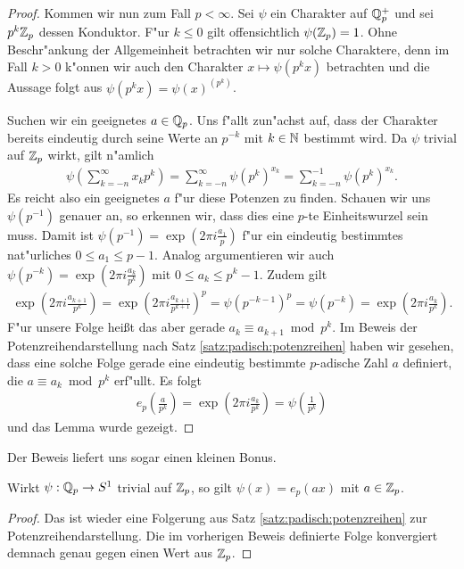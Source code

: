 \begin{proof}
			Kommen wir nun zum Fall $p<\infty$. 
			Sei $\psi$ ein Charakter auf $\mathbb{Q}_p^+$ und sei $p^k{\mathbb{Z}_p}$ dessen Konduktor.
			F"ur $k\leq0$ gilt offensichtlich $\psi({\mathbb{Z}_p})=1$.
			Ohne Beschr"ankung der Allgemeinheit betrachten wir nur solche Charaktere, denn im Fall $k>0$ k"onnen wir auch den Charakter $x\mapsto \psi(p^kx)$ betrachten und die Aussage folgt aus $\psi(p^kx) = \psi(x)^{(p^k)}$.
			
			Suchen wir ein geeignetes $a\in{\mathbb{Q}_p}$. 
			Uns f"allt zun"achst auf, dass der Charakter bereits eindeutig durch seine Werte an $p^{-k}$ mit $k \in \mathbb{N}$ bestimmt wird.
			Da $\psi$ trivial auf ${\mathbb{Z}_p}$ wirkt, gilt n"amlich
			\begin{align*}
				\psi \left( \sum_{k=-n}^\infty x_k p^k \right) = \sum_{k=-n}^{\infty} \psi \left(p^k \right)^{x_k} = \sum_{k=-n}^{-1} \psi \left(p^k \right)^{x_k}.
			\end{align*}
			Es reicht also ein geeignetes $a$ f"ur diese Potenzen zu finden.
			Schauen wir uns $\psi(p^{-1})$ genauer an, so erkennen wir, dass dies eine $p$-te Einheitswurzel sein muss.
			Damit ist $\psi(p^{-1}) = \exp(2\pi i \frac{a_1}{p})$ f"ur ein eindeutig bestimmtes nat"urliches $0\leq a_1 \leq p - 1$.
			Analog argumentieren wir auch $\psi(p^{-k}) = \exp(2\pi i \frac{a_k}{p^k})$ mit $0\leq a_k \leq p^k - 1$.
			Zudem gilt 
			\begin{align*}
				\exp\left(2\pi i \frac{a_{k+1}}{p^{k}}\right) = \exp\left(2\pi i \frac{a_{k+1}}{p^{k+1}}\right)^{p}= \psi(p^{-k-1})^p = \psi(p^{-k}) = \exp\left(2\pi i \frac{a_k}{p^k}\right).
			\end{align*}
			F"ur unsere Folge heißt das aber gerade $a_k \equiv a_{k+1} \bmod{p^k}$.
			Im Beweis der Potenzreihendarstellung nach Satz \ref{satz:padisch:potenzreihen} haben wir gesehen, dass eine solche Folge gerade eine eindeutig bestimmte $p$-adische Zahl $a$ definiert, die $a \equiv a_k \bmod{p^k}$ erf"ullt.
			Es folgt
			\begin{align*}
				e_p\left( \frac{a}{p^{k}} \right) = \exp\left( 2\pi i \frac{a_k}{p^k} \right) = \psi \left( \frac{1}{p^k} \right)
			\end{align*}
			und das Lemma wurde gezeigt.
		\end{proof}
		Der Beweis liefert uns sogar einen kleinen Bonus.
		\begin{korollar}\label{kor:lokal:charTrivialZp}
			Wirkt $\psi:{\mathbb{Q}_p}\to S^1$ trivial auf ${\mathbb{Z}_p}$, so gilt $\psi(x) = e_p(ax)$ mit $a\in {\mathbb{Z}_p}$.
		\end{korollar}
		\begin{proof}
			Das ist wieder eine Folgerung aus Satz \ref{satz:padisch:potenzreihen} zur Potenzreihendarstellung.
			Die im vorherigen Beweis definierte Folge konvergiert demnach genau gegen einen Wert aus ${\mathbb{Z}_p}$.
		\end{proof}
		
